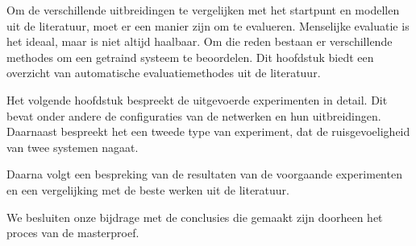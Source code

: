 Om de verschillende uitbreidingen te vergelijken met het startpunt en modellen uit de literatuur, moet er een manier zijn om te evalueren. Menselijke evaluatie is het ideaal, maar is niet altijd haalbaar. Om die reden bestaan er verschillende methodes om een getraind systeem te beoordelen. Dit hoofdstuk biedt een overzicht van automatische evaluatiemethodes uit de literatuur.

Het volgende hoofdstuk bespreekt de uitgevoerde experimenten in detail. Dit bevat onder andere de configuraties van de netwerken en hun uitbreidingen. Daarnaast bespreekt het een tweede type van experiment, dat de ruisgevoeligheid van twee systemen nagaat.

Daarna volgt een bespreking van de resultaten van de voorgaande experimenten en een vergelijking met de beste werken uit de literatuur.

We besluiten onze bijdrage met de conclusies die gemaakt zijn doorheen het proces van de masterproef.
 
